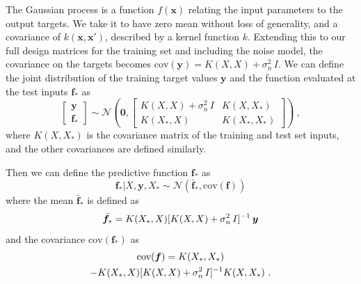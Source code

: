 The Gaussian process is a function $f(\bm{x})$ relating the input parameters to the output targets.
We take it to have zero mean without loss of generality, and a covariance of $k(\bm{x}, \bm{x'})$, described by a kernel function $k$. 
Extending this to our full design matrices for the training set and including the noise model, the covariance on the targets becomes $\mathrm{cov}(\bm{y}) = K(X,X) + \sigma_n^2\,I$.
We can define the joint distribution of the training target values $\bm{y}$ and the function evaluated at the test inputs $\bm{f}_*$ as
\begin{equation}
    \begin{bmatrix}
    \bm{y}\\
    \bm{f}_*
    \end{bmatrix}
    \sim \mathcal{N}\left( \bm{0}, 
    \begin{bmatrix}
    K(X,X) + \sigma_n^2\,I & K(X,X_*)\\
    K(X_*,X) & K(X_*,X_*)
    \end{bmatrix}
    \right) ~,
\end{equation}
where $K(X,X_*)$ is the covariance matrix of the training and test set inputs, and the other covariances are defined similarly.

Then we can define the predictive function $\bm{f}_*$  as
\begin{equation}
\label{eq:gp_pred}
    \bm{f}_* | X, \bm{y}, X_* \sim \mathcal{N}\left( \bar{\bm{f}}_*, \mathrm{cov}(\bm{f}) \right)
\end{equation}
where the mean $\bar{\bm{f}}_*$ is defined as
\begin{equation}
    \bar{\bm{f}}_* = K(X_*, X) [K(X,X) + \sigma_n^2\,I]^{-1} \, \bm{y} 
\end{equation}
and the covariance  $\mathrm{cov}(\bm{f}_*)$ as
\begin{multline}
    \mathrm{cov}(\bm{f}) = K(X_*, X_*) \\ 
    - K(X_*, X)[K(X,X) + \sigma_n^2\,I]^{-1} K(X,X_*) ~.
\end{multline}

